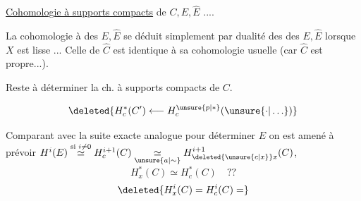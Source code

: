 \uline{Cohomologie à supports compacts}  de $C,E,\widehat E$ ....

La cohomologie à  des $E,\widehat E$ se déduit simplement par dualité des   des $E,\widehat E$ lorsque $X$ est lisse ... Celle de $\widehat C$ est identique à sa cohomologie usuelle (car $\widehat C$ est propre...).

Reste à déterminer la ch. à supports compacts de $C$.

\[
\deleted{H_c^*(C')\longleftarrow H_c^{\unsure{p|*}}(\unsure{\cdot|\ldots})}
\]


Comparant avec la suite exacte analogue pour déterminer  $E$  on est amené à prévoir $H^i(E)\overset{\text{si }i\ne0}{\simeq}H_c^{i+1}(C)\mathrel{\underset{\unsure{a|\sim}}{\simeq}}H_{\deleted{\unsure{c|x}}x}^{i+1}(C)$,  
\[
\boxed{H_x^*(C)\simeq H_c^*(C)\quad ??}
\]
\[
\deleted{H_x^i(C)=H_c^i(C)=}
\]

